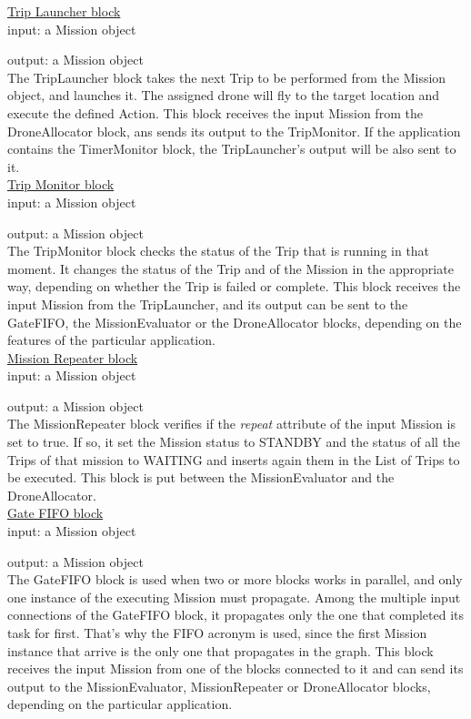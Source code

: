 \underline{Trip Launcher block}
\\

input: a Mission object

output: a Mission object
\\
The TripLauncher block takes the next Trip to be performed from the Mission object, and launches it.
The assigned drone will fly to the target location and execute the defined Action.
This block receives the input Mission from the DroneAllocator block, ans sends its output to the TripMonitor.
If the application contains the TimerMonitor block, the TripLauncher's output will be also sent to it.
\\

\underline{Trip Monitor block}
\\

input: a Mission object

output: a Mission object
\\

The TripMonitor block checks the status of the Trip that is running in that moment.
It changes the status of the Trip and of the Mission in the appropriate way, depending on whether the Trip is failed or complete.
This block receives the input Mission from the TripLauncher, and its output can be sent to the GateFIFO, the MissionEvaluator or the DroneAllocator blocks, depending on the features of the particular application.
\\



\underline{Mission Repeater block}
\\

input: a Mission object

output: a Mission object
\\

The MissionRepeater block verifies if the \textit{repeat} attribute of the input Mission is set to true.
If so, it set the Mission status to STANDBY and the status of all the Trips of that mission to WAITING and inserts again them in the List of Trips to be executed.
This block is put between the MissionEvaluator and the DroneAllocator.
\\

\underline{Gate FIFO block}
\\

input: a Mission object

output: a Mission object
\\

The GateFIFO block is used when two or more blocks works in parallel, and only one instance of the executing Mission must propagate.
Among the multiple input connections of the GateFIFO block, it propagates only the one that completed its task for first.
That's why the FIFO acronym is used, since the first Mission instance that arrive is the only one that propagates in the graph.
This block receives the input Mission from one of the blocks connected to it and can send its output to the MissionEvaluator, MissionRepeater or DroneAllocator blocks, depending on the particular application.
\\

